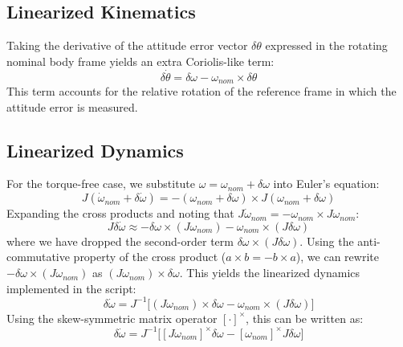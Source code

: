 \documentclass[11pt]{article}
\begin{document}
\subsection{Linearized Kinematics}
Taking the derivative of the attitude error vector $\delta\theta$ expressed in the rotating nominal body frame yields an extra Coriolis-like term:
\begin{equation}
    \delta\dot{\theta} = \delta\omega - \omega_{nom} \times \delta\theta
\end{equation}
This term accounts for the relative rotation of the reference frame in which the attitude error is measured.

\subsection{Linearized Dynamics}
For the torque-free case, we substitute $\omega = \omega_{nom} + \delta\omega$ into Euler's equation:
\begin{equation}
    J (\dot{\omega}_{nom} + \delta\dot{\omega}) = -(\omega_{nom} + \delta\omega) \times J(\omega_{nom} + \delta\omega)
\end{equation}
Expanding the cross products and noting that $J\dot{\omega}_{nom} = -\omega_{nom} \times J\omega_{nom}$:
\begin{equation}
    J\delta\dot{\omega} \approx - \delta\omega \times (J\omega_{nom}) - \omega_{nom} \times (J\delta\omega)
\end{equation}
where we have dropped the second-order term $\delta\omega \times (J\delta\omega)$.
Using the anti-commutative property of the cross product ($a \times b = -b \times a$), we can rewrite $-\delta\omega \times (J\omega_{nom})$ as $(J\omega_{nom}) \times \delta\omega$. This yields the linearized dynamics implemented in the script:
\begin{equation}
    \delta\dot{\omega} = J^{-1} \Big[ (J\omega_{nom}) \times \delta\omega - \omega_{nom} \times (J\delta\omega) \Big]
\end{equation}
Using the skew-symmetric matrix operator $[\cdot]^\times$, this can be written as:
\begin{equation}
    \delta\dot{\omega} = J^{-1} \Big[ [J\omega_{nom}]^\times \delta\omega - [\omega_{nom}]^\times J \delta\omega \Big]
\end{equation}
\end{document}
